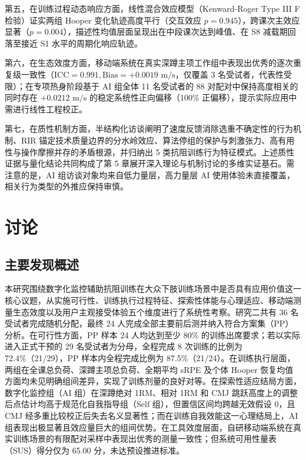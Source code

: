 \documentclass[UTF8,zihao=-4,twoside,openany]{ctexbook}
\begin{document}
第五，在训练过程动态响应方面，线性混合效应模型（Kenward-Roger Type III F 检验）证实两组 Hooper 变化轨迹高度平行（交互效应 $p=0.945$），跨课次主效应显著（$p=0.004$），描述性均值层面呈现出在中段课次达到峰值、在 S8 减载期回落至接近 S1 水平的周期化响应轨迹。

第六，在生态效度方面，移动端系统在真实深蹲主项工作组中表现出优秀的逐次重复级一致性（$\text{ICC}=0.991, \text{Bias}=+0.0019\text{ m/s}$，仅覆盖 3 名受试者，代表性受限）；在专项热身阶段基于 AI 组全体 11 名受试者的 88 对配对中保持高度相关的同时存在 $+0.0212\text{ m/s}$ 的稳定系统性正向偏移（100\% 正偏移），提示实际应用中需进行线性工程校正。

第七，在质性机制方面，半结构化访谈阐明了速度反馈消除选重不确定性的行为机制、RIR 锚定技术质量边界的分水岭效应、算法停组的保护与刺激张力、高有用性与操作摩擦并存的矛盾根源，并归纳出 5 类抗阻训练行为特征模式。上述质性证据与量化结论共同构成了第 5 章展开深入理论与机制讨论的多维实证基石。需注意的是，AI 组访谈对象均来自低力量层，高力量层 AI 使用体验未直接覆盖，相关行为类型的外推应保持审慎。%
\clearpage
\chapter{讨论}

\section{主要发现概述}
本研究围绕数字化监控辅助抗阻训练在大众下肢训练场景中是否具有应用价值这一核心议题，从实施可行性、训练执行过程特征、探索性体能与心理适应、移动端测量生态效度以及用户主观接受体验五个维度进行了系统性考察。研究二共有 36 名受试者完成随机分配，最终 24 人完成全部主要前后测并纳入符合方案集（PP）分析。在可行性方面，PP 样本 24 人均达到至少 80\% 的训练出席要求；若以实际进入正式干预的 29 名受试者为分母，全程完成 8 次训练的比例为 72.4\%（21/29），PP 样本内全程完成比例为 87.5\%（21/24）。在训练执行层面，两组在全课总负荷、深蹲主项总负荷、全期平均 sRPE 及个体 Hooper 恢复均值方面均未见明确组间差异，实现了训练剂量的良好对等。在探索性适应结局方面，数字化监控组（AI 组）在深蹲绝对 1RM、相对 1RM 和 CMJ 跳跃高度上的调整后点估计均高于规范化自我指导组（Self 组），但置信区间均跨越无效假设 0，且 CMJ 经多重比较校正后失去名义显著性；而在训练自我效能这一心理结局上，AI 组表现出极显著且效应量巨大的组间优势。在工具效度层面，自研移动端系统在真实训练场景的有限配对采样中表现出优秀的测量一致性；但系统可用性量表（SUS）得分仅为 65.00 分，未达预设推进标准。
\end{document}
